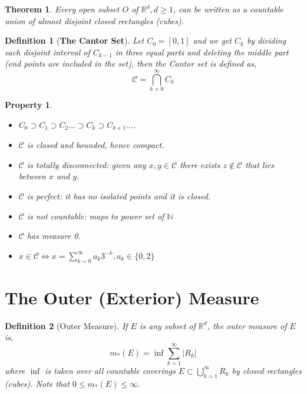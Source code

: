 \documentclass{report}
\newtheorem{thm}{Theorem}
\newtheorem{defn}{Definition}
\newtheorem{property}{Property}
\newcommand{\reals}{\mathbb{R}}
\newcommand{\naturals}{\mathbb{N}}
\newcommand{\calC}{{\mathcal{C}}}
\newcommand{\tb}[1]{{\textbf{#1}}}
\newcommand{\set}[1]{\big\lbrace #1 \big\rbrace}
\newcommand{\union}{\bigcup}
\newcommand{\vl}{\Big|}
\newcommand{\intersection}{\bigcap}
\begin{document}
\begin{thm}
	Every open subset $O$ of $\reals^d, d \geq 1$, can be written as a countable union of almost disjoint closed rectangles (cubes).
\end{thm}

\begin{defn}[\tb{The Cantor Set}]
	Let $C_0 = [0, 1]$ and we get $C_k$ by dividing each disjoint interval of $C_{k-1}$ in three equal parts and deleting the middle part (end points are included in the set), then the Cantor set is defined as,
	$$ \calC =  \intersection_{k=0}^{\infty} C_k$$
\end{defn}
\begin{property}\item
	\begin{itemize}
		\item $C_0 \supset C_1 \supset C_2 \dots \supset C_k \supset C_{k+1} \dots$.
		\item $\calC$ is closed and	bounded, hence compact. 
		\item $\calC$ is totally disconnected: given any $x, y \in \calC$ there exists $z \notin \calC$ that lies between $x$ and $y$. 
		\item $\calC$ is perfect: it has no isolated points and it is closed.
		\item $\calC$ is not countable: maps to power set of $\naturals$
		\item $\calC$ has measure 0.
		\item $x \in \calC \iff x = \sum_{k=0}^{\infty} a_k 3^{-k}, a_k \in \set{0, 2}$ 
	\end{itemize}
\end{property}

\section{The Outer (Exterior) Measure}

\begin{defn}[Outer Measure]
	If $E$ is any subset of $\reals^d$, the	outer measure of $E$ is,
	$$m_{*}(E) = \inf \sum_{k=1}^{\infty} \vl R_k \vl $$
	where $\inf$ is taken over all countable coverings $E \subset \union_{k=1}^{\infty} R_k$ by closed rectangles (cubes). Note that $0 \leq m_*(E) \leq \infty$.
\end{defn}
\end{document}

